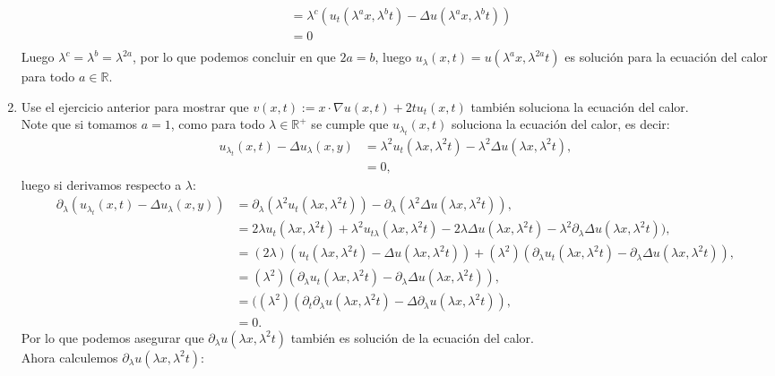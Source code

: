 \begin{homeworkProblem}
\begin{solucion}
\begin{enumerate}
\begin{align*}
          &=\lambda^c(u_{t}(\lambda^ax,\lambda^bt)-\Delta u(\lambda^ax,\lambda^bt))\\
          &=0\\
        \end{align*}
        Luego $\lambda^c=\lambda^b=\lambda^{2a}$, por lo que podemos concluir en que $2a=b$, luego $u_{\lambda}(x,t)=u(\lambda^{a}x,\lambda^{2a}t)$ es solución para la ecuación del calor para todo $a\in \mathbb{R}$.
        \demostrado
      \item Use el ejercicio anterior para mostrar que $v(x,t):=x\cdot \nabla u(x,t)+2tu_t(x,t)$ también soluciona la ecuación del calor.\\
        Note que si tomamos $a=1$, como para todo $\lambda\in\mathbb{R}^{+}$ se cumple que $u_{\lambda_{t}}(x,t)$ soluciona la ecuación del calor, es decir:
        \begin{align*}
          u_{\lambda_{t}}(x,t)-\Delta u_{\lambda}(x,y)&=\lambda^2u_t(\lambda x,\lambda^2t)-\lambda^2\Delta u(\lambda x,\lambda^2 t),\\
          &=0,
        \end{align*}
        luego si derivamos respecto a $\lambda$:
        \begin{align*}
          \partial_{\lambda}(u_{\lambda_{t}}(x,t)-\Delta u_{\lambda}(x,y))&=\partial_{\lambda}(\lambda^2u_t(\lambda x,\lambda^2t))-\partial_{\lambda}(\lambda^2\Delta u(\lambda x,\lambda^2 t)),\\
          &=2\lambda u_t(\lambda x,\lambda^2 t)+\lambda^2u_{t\lambda}(\lambda x,\lambda^2 t)-2\lambda\Delta u(\lambda x,\lambda^2 t)-\lambda^2\partial_{\lambda}\Delta u(\lambda x,\lambda^2 t)),\\
          &=(2\lambda)(u_t(\lambda x,\lambda^2 t)-\Delta u(\lambda x,\lambda^2 t))+(\lambda^2)(\partial_{\lambda}u_t(\lambda x,\lambda^2 t)-\partial_{\lambda}\Delta u(\lambda x,\lambda^2 t)),\\
          &=(\lambda^2)(\partial_{\lambda}u_t(\lambda x,\lambda^2 t)-\partial_{\lambda}\Delta u(\lambda x,\lambda^2 t)),\\
          &=((\lambda^2)(\partial_{t}\partial_{\lambda}u(\lambda x,\lambda^2 t)-\Delta \partial_{\lambda}u(\lambda x,\lambda^2 t)),\\
          &=0.
        \end{align*}
        Por lo que podemos asegurar que $\partial_{\lambda}u(\lambda x,\lambda^2 t)$ también es solución de la ecuación del calor.\\
        Ahora calculemos $\partial_{\lambda}u(\lambda x,\lambda^2 t)$:

\end{enumerate}
\end{solucion}
\end{homeworkProblem}
